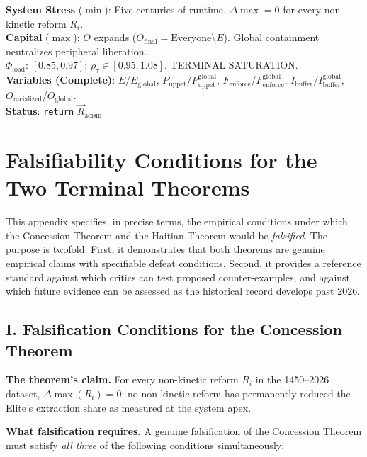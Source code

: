\begin{tcolorbox}[colback=black!5, colframe=black!70, fonttitle=\bfseries\ttfamily, title=12. RUNTIME LOG: FINAL OUTPUT \normalfont\small--- Chapters 11--12]
\ttfamily\small
\textbf{System Stress} ($\min$): Five centuries of runtime. $\Delta\max = 0$ for every non-kinetic reform $R_i$.\\
\textbf{Capital} ($\max$): $O$ expands ($O_{\text{final}} = \text{Everyone} \setminus E$). Global containment neutralizes peripheral liberation.\\
\textbf{$\Phi_{\text{load}}$}: $[0.85, 0.97]$; $\rho_{\tau} \in [0.95, 1.08]$. TERMINAL SATURATION.\\
\textbf{Variables (Complete)}: $E$/$E_{\text{global}}$, $P_{\text{uppet}}$/$P_{\text{uppet}}^{\text{global}}$, $F_{\text{enforce}}$/$F_{\text{enforce}}^{\text{global}}$, $I_{\text{buffer}}$/$I_{\text{buffer}}^{\text{global}}$, $O_{\text{racialized}}$/$O_{\text{global}}$.\\
\textbf{Status}: \texttt{return} $\vec{R}_{\text{acism}}$
\end{tcolorbox}

\chapter{Falsifiability Conditions for the Two Terminal Theorems}
\label{app:falsifiability}

This appendix specifies, in precise terms, the empirical conditions under which the Concession Theorem and the Haitian Theorem would be \textit{falsified}. The purpose is twofold. First, it demonstrates that both theorems are genuine empirical claims with specifiable defeat conditions. Second, it provides a reference standard against which critics can test proposed counter-examples, and against which future evidence can be assessed as the historical record develops past 2026.

\section*{I. Falsification Conditions for the Concession Theorem}

\textbf{The theorem's claim.} For every non-kinetic reform $R_i$ in the 1450--2026 dataset, $\Delta\max(R_i) = 0$: no non-kinetic reform has permanently reduced the Elite's extraction share as measured at the system apex.

\textbf{What falsification requires.} A genuine falsification of the Concession Theorem must satisfy \textit{all three} of the following conditions simultaneously:

